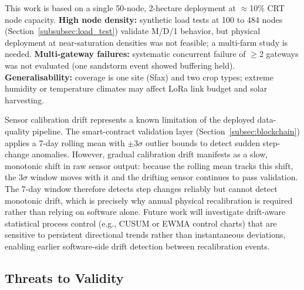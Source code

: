 \documentclass[pdflatex,sn-mathphys-num]{sn-jnl}
\theoremstyle{thmstyleone}
\theoremstyle{thmstyletwo}
\theoremstyle{thmstylethree}
\begin{document}
This work is based on a single 50-node, 2-hectare deployment at $\approx$10\% CRT node capacity. \textbf{High node density:} synthetic load tests at 100 to 484 nodes (Section~\ref{subsubsec:load_test}) validate M/D/1 behavior, but physical deployment at near-saturation densities was not feasible; a multi-farm study is needed. \textbf{Multi-gateway failures:} systematic concurrent failure of $\geq$2 gateways was not evaluated (one sandstorm event showed buffering held). \textbf{Generalisability:} coverage is one site (Sfax) and two crop types; extreme humidity or temperature climates may affect LoRa link budget and solar harvesting.

Sensor calibration drift represents a known limitation of the deployed data-quality pipeline. The smart-contract validation layer (Section~\ref{subsec:blockchain}) applies a 7-day rolling mean with $\pm 3\sigma$ outlier bounds to detect sudden step-change anomalies. However, gradual calibration drift manifests as a slow, monotonic shift in raw sensor output: because the rolling mean tracks this shift, the $3\sigma$ window moves with it and the drifting sensor continues to pass validation. The 7-day window therefore detects step changes reliably but cannot detect monotonic drift, which is precisely why annual physical recalibration is required rather than relying on software alone. Future work will investigate drift-aware statistical process control (e.g., CUSUM or EWMA control charts) that are sensitive to persistent directional trends rather than instantaneous deviations, enabling earlier software-side drift detection between recalibration events.

\subsection{Threats to Validity}
\label{subsec:threats_validity}
\end{document}
